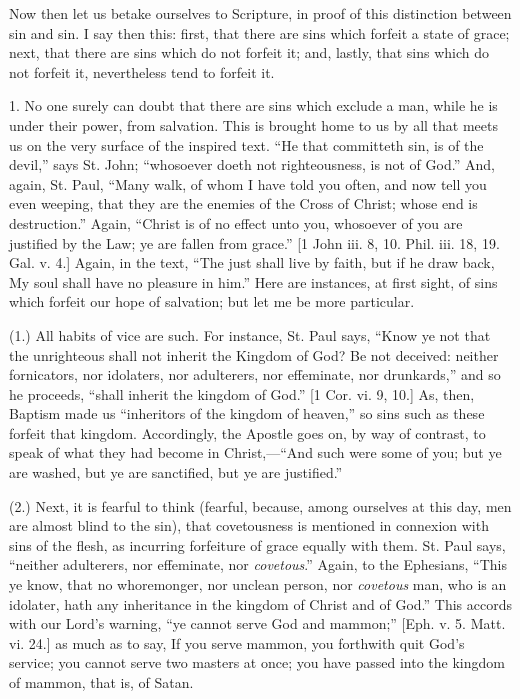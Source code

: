 Now then let us betake ourselves to Scripture, in proof of this
distinction between sin and sin. I say then this: first, that there
are sins which forfeit a state of grace; next, that there are sins
which do not forfeit it; and, lastly, that sins which do not forfeit
it, nevertheless tend to forfeit it.

1. No one surely can doubt that there are sins which exclude a man,
while he is under their power, from salvation. This is brought home to
us by all that meets us on the very surface of the inspired text.
``He that committeth sin, is of the devil,'' says St. John;
``whosoever doeth not righteousness, is not of God.'' And,
again, St. Paul, ``Many walk, of whom I have told you often, and
now tell you even weeping, that they are the enemies of the Cross of
Christ; whose end is destruction.'' Again, ``Christ is of no
effect unto you, whosoever of you are justified by the Law; ye are
fallen from grace.'' [1 John iii. 8, 10. Phil. iii. 18, 19. Gal.
v. 4.] Again, in the text, ``The just shall live by faith, but if
he draw back, My soul shall have no pleasure in him.'' Here are
instances, at first sight, of sins which forfeit our hope of
salvation; but let me be more particular.

(1.) All habits of vice are such. For instance, St. Paul says,
``Know ye not that the unrighteous shall not inherit the Kingdom
of God? Be not deceived: neither fornicators, nor idolaters, nor
adulterers, nor effeminate, nor drunkards,'' and so he proceeds,
``shall inherit the kingdom of God.'' [1 Cor. vi. 9, 10.] As,
then, Baptism made us ``inheritors of the kingdom of heaven,''
so sins such as these forfeit that kingdom. Accordingly, the Apostle
goes on, by way of contrast, to speak of what they had become in
Christ,—``And such were some of you; but ye are washed, but ye
are sanctified, but ye are justified.''

(2.) Next, it is fearful to think (fearful, because, among
ourselves at this day, men are almost blind to the sin), that
covetousness is mentioned in connexion with sins of the flesh, as
incurring forfeiture of grace equally with them. St. Paul says,
``neither adulterers, nor effeminate, nor \emph{covetous}.''
Again, to the Ephesians, ``This ye know, that no whoremonger, nor
unclean person, nor \emph{covetous} man, who is an idolater, hath any
inheritance in the kingdom of Christ and of God.'' This accords
with our Lord's warning, ``ye cannot serve God and mammon;''
[Eph. v. 5. Matt. vi. 24.] as much as to say, If you serve mammon, you
forthwith quit God's service; you cannot serve two masters at once;
you have passed into the kingdom of mammon, that is, of Satan.

